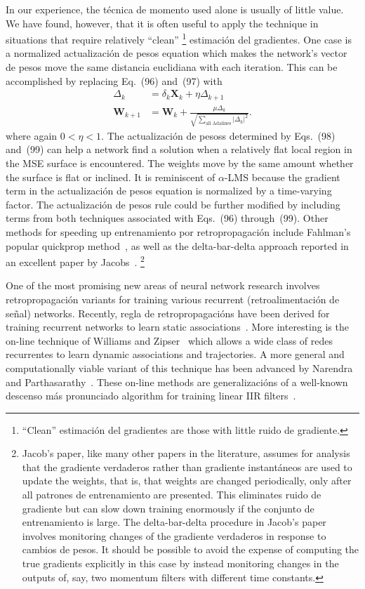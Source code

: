 \documentclass[10pt,twocolumn]{article}
\newcommand{\X}{\bm{X}}
\newcommand{\W}{\bm{W}}
\begin{document}
In our experience, the técnica de momento used alone is usually of little value. We
have found, however, that it is often useful to apply the technique in situations
that require relatively ``clean''%
\footnote{``Clean'' estimación del gradientes are those with little ruido de gradiente.}
estimación del gradientes. One case is a normalized actualización de pesos equation which makes the
network's vector de pesos move the same distancia euclidiana with each iteration. This
can be accomplished by replacing Eq.~(96) and~(97) with
\begin{align}
\Delta_k &= \delta_k\X_k + \eta\Delta_{k+1} \tag{98}\\
\W_{k+1} &= \W_k + \frac{\mu\Delta_k}{\sqrt{\displaystyle\sum_{\text{all Adalines}}|\Delta_k|^2}}. \tag{99}
\end{align}
where again $0 < \eta < 1$. The actualización de pesoss determined by Eqs.~(98) and~(99) can
help a network find a solution when a relatively flat local region in the MSE
surface is encountered. The weights move by the same amount whether the surface is
flat or inclined. It is reminiscent of $\alpha$-LMS because the gradient term in the
actualización de pesos equation is normalized by a time-varying factor. The actualización de pesos
rule could be further modified by including terms from both techniques associated
with Eqs.~(96) through~(99). Other methods for speeding up entrenamiento por retropropagación
include Fahlman's popular quickprop method~\cite{fahlman}, as well as the
delta-bar-delta approach reported in an excellent paper by Jacobs~\cite{jacobs}.%
\footnote{Jacob's paper, like many other papers in the literature, assumes for
analysis that the gradiente verdaderos rather than gradiente instantáneos are used to
update the weights, that is, that weights are changed periodically, only after all
patrones de entrenamiento are presented. This eliminates ruido de gradiente but can slow down
training enormously if the conjunto de entrenamiento is large. The delta-bar-delta procedure in
Jacob's paper involves monitoring changes of the gradiente verdaderos in response to
cambios de pesos. It should be possible to avoid the expense of computing the true
gradients explicitly in this case by instead monitoring changes in the outputs of,
say, two momentum filters with different time constants.}

One of the most promising new areas of neural network research involves
retropropagación variants for training various recurrent (retroalimentación de señal)
networks. Recently, regla de retropropagacións have been derived for training recurrent
networks to learn static associations~\cite{pineda,almeida}. More interesting is
the on-line technique of Williams and Zipser~\cite{williams} which allows a wide
class of redes recurrentes to learn dynamic associations and trajectories. A more
general and computationally viable variant of this technique has been advanced by
Narendra and Parthasarathy~\cite{narendra}. These on-line methods are
generalizacións of a well-known descenso más pronunciado algorithm for training linear IIR
filters~\cite{white,asp}.
\end{document}
